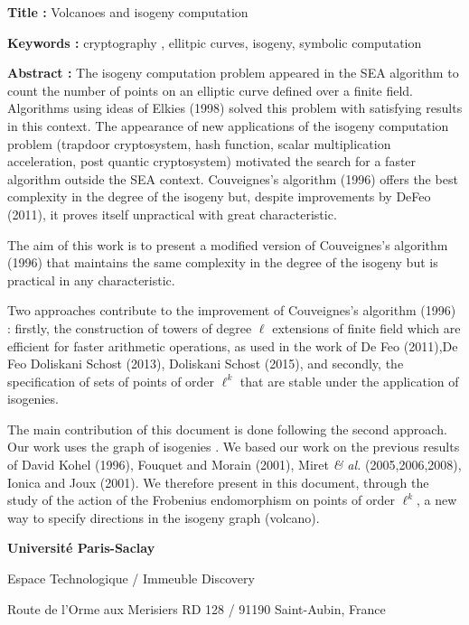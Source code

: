 \documentclass[a4paper, titlepage, 11pt]{book}
\newcommand{\titreeng}{Volcanoes and isogeny computation}
\begin{document}
\begin{breakbox}

\noindent\textbf{Title : }\titreeng

\vspace{2ex}

\noindent\textbf{Keywords : }cryptography , ellitpic curves, isogeny, 
symbolic computation

\begin{multicols}{2}
\noindent\textbf{Abstract : }
The isogeny computation problem appeared in the SEA algorithm to count the number 
of points on an elliptic curve defined over a finite field. Algorithms using 
ideas of Elkies (1998) solved this problem with satisfying results in this 
context. The appearance of new applications of the isogeny computation problem 
(trapdoor cryptosystem, hash function, scalar multiplication acceleration, post
quantic cryptosystem) motivated the search for a faster algorithm outside the 
SEA context. Couveignes's algorithm (1996) offers the best complexity in the 
degree of the isogeny but, despite improvements by DeFeo (2011), it proves 
itself unpractical with great characteristic.

The aim of this work is to present a modified version of Couveignes's 
algorithm (1996) that maintains the same complexity in the degree of the 
isogeny but is practical in any characteristic.

Two approaches contribute to the improvement of Couveignes's algorithm
(1996) : firstly, the construction of towers of degree $\ell$ extensions of finite field 
which are efficient for faster arithmetic operations, as used in the work of De Feo 
(2011),De Feo Doliskani Schost (2013), Doliskani Schost (2015), and secondly, 
the specification of sets of points of order $\ell^k$ that are stable under the application
of isogenies.

The main contribution of this document is done following the second approach. 
Our work uses the graph of isogenies . We based our work on the previous 
results of David Kohel (1996), Fouquet and Morain (2001), Miret \emph{\& al.}
(2005,2006,2008), Ionica and Joux (2001). We therefore present in this 
document, through the study of the action of the Frobenius endomorphism on 
points of order $\ell^k$, a new way to specify directions in the isogeny graph (volcano). 

\end{multicols}
\end{breakbox}


{\tiny
\noindent
\textbf{Université Paris-Saclay}

\noindent
Espace Technologique / Immeuble Discovery

\noindent
Route de l’Orme aux Merisiers RD 128 / 91190 Saint-Aubin, France 

}
\end{document}
